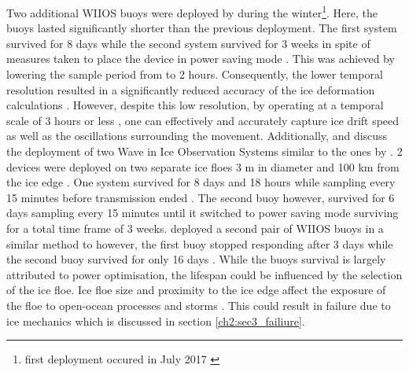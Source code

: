  Two additional WIIOS buoys were deployed by \textcite{alberello2019drift} during the winter\footnote{first deployment occured in July 2017 \cite{alberello2019drift}}. Here, the buoys lasted significantly shorter than the previous deployment. The first system survived for 8 days while the second system survived for 3 weeks in spite of measures taken to place the device in power saving mode \cite{alberello2019drift}. This was achieved by lowering the sample period from to 2 hours. Consequently, the lower temporal resolution resulted in a significantly reduced accuracy of the ice deformation calculations \cite{alberello2019drift}. However, despite this low resolution, by operating at a temporal scale of 3 hours or less \cite{alberello2019drift}, one can effectively and accurately capture ice drift speed as well as the oscillations surrounding the movement. Additionally, \textcite{vichi2019effects} and \cite{albarello2020drift} discuss the deployment of two Wave in Ice Observation Systems similar to the ones by \cite{kohout2015device}. 2 devices were deployed on two separate ice floes 3 m in diameter and 100 km from the ice edge \cite{albarello2020drift}. One system survived for 8 days and 18 hours while sampling every 15 minutes before transmission ended \cite{albarello2020drift}. The second buoy however, survived for 6 days sampling every 15 minutes until it switched to power saving mode surviving for a total time frame of 3 weeks. \textcite{vichi2019effects} deployed a second pair of WIIOS buoys in a similar method to \cite{alberello2019drift} however, the first buoy stopped responding after 3 days while the second buoy survived for only 16 days \cite{vichi2019effects}. While the buoys survival is largely attributed to power optimisation, the lifespan could be influenced by the selection of the ice floe. Ice floe size and proximity to the ice edge affect the exposure of the floe to open-ocean processes and storms \cite{vichi2019effects}. This could result in failure due to ice mechanics which is discussed in section \ref{ch2:sec3_failiure}. \par 

